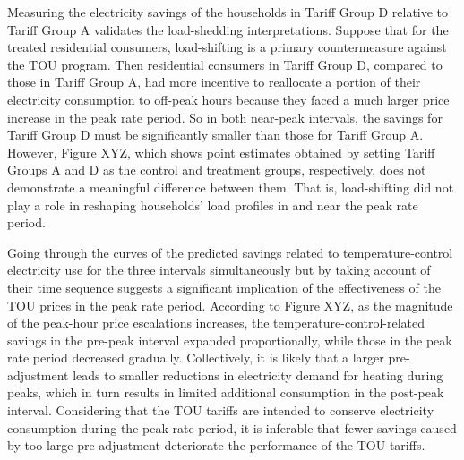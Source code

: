 Measuring the electricity savings of the households in Tariff Group D relative to Tariff Group A validates the load-shedding interpretations. Suppose that for the treated residential consumers, load-shifting is a primary countermeasure against the TOU program. Then residential consumers in Tariff Group D, compared to those in Tariff Group A, had more incentive to reallocate a portion of their electricity consumption to off-peak hours because they faced a much larger price increase in the peak rate period. So in both near-peak intervals, the savings for Tariff Group D must be significantly smaller than those for Tariff Group A. However, Figure XYZ, which shows point estimates obtained by setting Tariff Groups A and D as the control and treatment groups, respectively, does not demonstrate a meaningful difference between them. That is, load-shifting did not play a role in reshaping households' load profiles in and near the peak rate period. 

Going through the curves of the predicted savings related to temperature-control electricity use for the three intervals simultaneously but by taking account of their time sequence suggests a significant implication of the effectiveness of the TOU prices in the peak rate period. According to Figure XYZ, as the magnitude of the peak-hour price escalations increases, the temperature-control-related savings in the pre-peak interval expanded proportionally, while those in the peak rate period decreased gradually. Collectively, it is likely that a larger pre-adjustment leads to smaller reductions in electricity demand for heating during peaks, which in turn results in limited additional consumption in the post-peak interval. Considering that the TOU tariffs are intended to conserve electricity consumption during the peak rate period, it is inferable that fewer savings caused by too large pre-adjustment deteriorate the performance of the TOU tariffs. 
